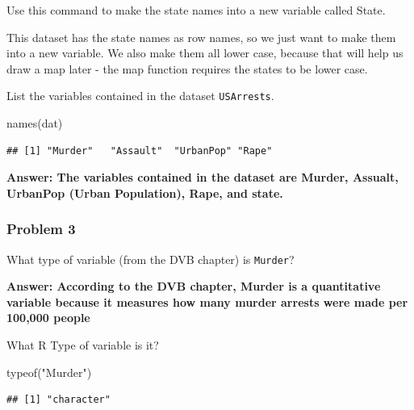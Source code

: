 \documentclass[
]{article}
\newenvironment{Shaded}{\begin{snugshade}}{\end{snugshade}}
\newcommand{\FunctionTok}[1]{\textcolor[rgb]{0.00,0.00,0.00}{#1}}
\newcommand{\NormalTok}[1]{#1}
\newcommand{\OtherTok}[1]{\textcolor[rgb]{0.56,0.35,0.01}{#1}}
\newcommand{\SpecialCharTok}[1]{\textcolor[rgb]{0.00,0.00,0.00}{#1}}
\newcommand{\StringTok}[1]{\textcolor[rgb]{0.31,0.60,0.02}{#1}}
\begin{document}
Use this command to make the state names into a new variable called
State.

\begin{Shaded}
\end{Shaded}

This dataset has the state names as row names, so we just want to make
them into a new variable. We also make them all lower case, because that
will help us draw a map later - the map function requires the states to
be lower case.

List the variables contained in the dataset \texttt{USArrests}.

\begin{Shaded}
\begin{Highlighting}[]
\FunctionTok{names}\NormalTok{(dat)}
\end{Highlighting}
\end{Shaded}

\begin{verbatim}
## [1] "Murder"   "Assault"  "UrbanPop" "Rape"
\end{verbatim}

\textbf{Answer: The variables contained in the dataset are Murder,
Assualt, UrbanPop (Urban Population), Rape, and state. }

\hypertarget{problem-3}{%
\subsubsection{Problem 3}\label{problem-3}}

What type of variable (from the DVB chapter) is \texttt{Murder}?

\textbf{Answer: According to the DVB chapter, Murder is a quantitative
variable because it measures how many murder arrests were made per
100,000 people}

What R Type of variable is it?

\begin{Shaded}
\begin{Highlighting}[]
\FunctionTok{typeof}\NormalTok{(}\StringTok{"Murder"}\NormalTok{)}
\end{Highlighting}
\end{Shaded}

\begin{verbatim}
## [1] "character"
\end{verbatim}
\end{document}
